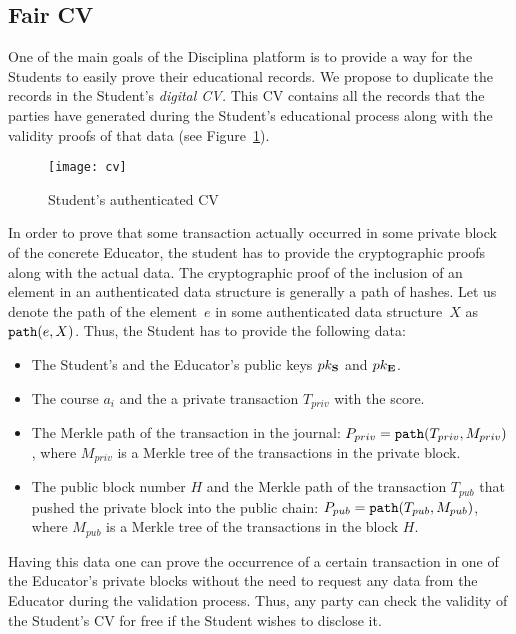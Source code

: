\subsection{Fair CV}
One of the main goals of the Disciplina platform is to provide a way for the Students to easily prove their educational records. We propose to duplicate the records in the Student's \textit{digital CV.} This CV contains all the records that the parties have generated during the Student's educational process along with the validity proofs of that data (see Figure~\ref{fig:cv}).

\begin{figure}[ht]
\centering
\texttt{[image: cv]}
\caption{Student's authenticated CV}
\label{fig:cv}
\end{figure}

In order to prove that some transaction actually occurred in some private block of the concrete Educator, the student has to provide the cryptographic proofs along with the actual data. The cryptographic proof of the inclusion of an element in an authenticated data structure is generally a path of hashes. Let us denote the path of the element~$e$ in some authenticated data structure~$X$ as~$\mathtt{path}(e, X)$. Thus, the Student has to  provide the following data:
\begin{itemize}
  \item The Student's and the Educator's public keys $pk_{\mathbf{S}}$ and $pk_{\mathbf{E}}$.
  \item The course $a_i$ and the a private transaction $T_{priv}$ with the score.
  \item The Merkle path of the transaction in the journal: $P_{priv} = \mathtt{path}(T_{priv}, M_{priv})$, where $M_{priv}$ is a Merkle tree of the transactions in the private block.
  \item The public block number $H$ and the Merkle path of the transaction $T_{pub}$ that pushed the private block into the public chain: $P_{pub} = \mathtt{path}(T_{pub}, M_{pub})$, where $M_{pub}$ is a Merkle tree of the transactions in the block $H$.
\end{itemize}

Having this data one can prove the occurrence of a certain transaction in one of the Educator's private blocks without the need to request any data from the Educator during the validation process. Thus, any party can check the validity of the Student's CV for free if the Student wishes to disclose it.

